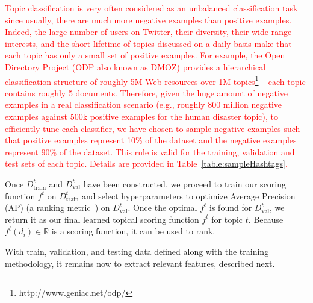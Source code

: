  \textcolor{red}{ Topic classification is very often considered as an unbalanced classification task since usually, there are much more negative examples than positive examples. Indeed, the large number of users on Twitter, their diversity, their wide range interests, and the short lifetime of topics discussed on a daily basis make that each topic has only a small set of positive examples.  For example, the Open Directory Project (ODP also known as DMOZ) provides a hierarchical classification structure of roughly 5M Web resources over 1M topics\footnote{http://www.geniac.net/odp/} -- each topic contains roughly 5 documents. Therefore, given the huge amount of negative examples in a real classification scenario (e.g., roughly 800 million negative examples against 500k positive examples for the human disaster topic), to efficiently tune each classifier, we have chosen to sample negative examples such that positive examples represent 10\% of the dataset and the negative examples represent 90\% of the dataset. This rule is valid for the training, validation and test sets of each topic.
 Details are provided in Table~\ref{table:sampleHashtags}.}




Once $D^t_\mathrm{train}$ and $D^t_\mathrm{val}$ have been constructed,
we proceed to train our scoring function $f^t$ on $D^t_\mathrm{train}$ and
select hyperparameters to optimize Average Precision (AP) (a ranking
metric~\cite{manning_ir}) on
$D^t_\mathrm{val}$.  Once the optimal $f^t$ is found for $D^t_\mathrm{val}$,
we return it as our final learned topical scoring function $f^t$ for topic $t$.
Because $f^t(d_i) \in \mathbb{R}$ is a scoring function, it can be used to rank.

With train, validation, and testing data defined along with the training methodology,
it remains now to extract relevant features, 
described next.









